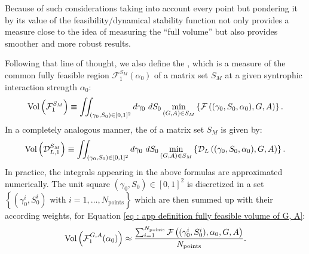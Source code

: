 \documentclass[12pt, titlepage, twoside, openright]{report}
\begin{document}
Because of such considerations taking into account every point but pondering it by its value of the feasibility/dynamical stability function not only provides a measure close to the idea of measuring the ``full volume'' but also provides smoother and more robust results.

Following that line of thought, we also define the , which is a measure of the common fully feasible region $\mathcal{F}_1^{S_M}(\alpha_0)$ of a matrix set $S_M$ at a given syntrophic interaction strength $\alpha_0$:
\begin{equation}
\text{Vol}\left(\mathcal{F}_1^{S_M}\right) \equiv \iint_{(\gamma_0, S_0) \in [0,1]^2} d\gamma_0 \ dS_0 \min_{(G,A)\in S_M} \left\{\mathcal{F}\left((\gamma_0, S_0, \alpha_0), G, A\right)\right\}.
\end{equation}
In a completely analogous manner, the  of a matrix set $S_M$ is given by:
\begin{equation}
\text{Vol}\left(\mathcal{D}_{L,1}^{S_M}\right) \equiv \iint_{(\gamma_0, S_0) \in [0,1]^2} d\gamma_0 \ dS_0 \min_{(G,A)\in S_M} \left\{\mathcal{D}_{L}\left((\gamma_0, S_0, \alpha_0), G, A\right)\right\}.
\end{equation}
In practice, the integrals appearing in the above formulas are approximated numerically. The unit square $(\gamma_0, S_0) \in [0,1]^2$ is discretized in a set $\left\{(\gamma_0^i, S_0^{i})\text{ with } i=1, \dots, N_\text{points}\right\}$ which are then summed up with their according weights, \eg for Equation \eqref{eq : app definition fully feasible volume of G, A}:
\begin{equation}
\text{Vol}\left(\mathcal{F}_1^{G,A}(\alpha_0)\right) \approx \frac{\sum_{i=1}^{N_\text{points}}\mathcal{F}\left((\gamma_0^{i}, S_0^{i}), \alpha_0, G, A\right)}{N_\text{points}}.
\end{equation}
\end{document}

